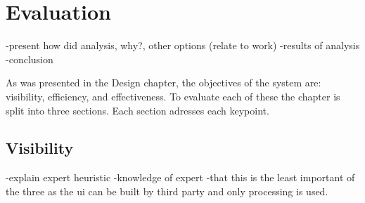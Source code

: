 \chapter{Evaluation}
-present how did analysis, why?, other options (relate to work)
-results of analysis
-conclusion
\par As was presented in the Design chapter, the objectives of the system are: visibility, efficiency, and effectiveness. To evaluate each of these the chapter is split into three sections. Each section adresses each keypoint.
\section{Visibility}
-explain expert heuristic
-knowledge of expert
-that this is the least important of the three as the ui can be built by third party and only processing is used.
